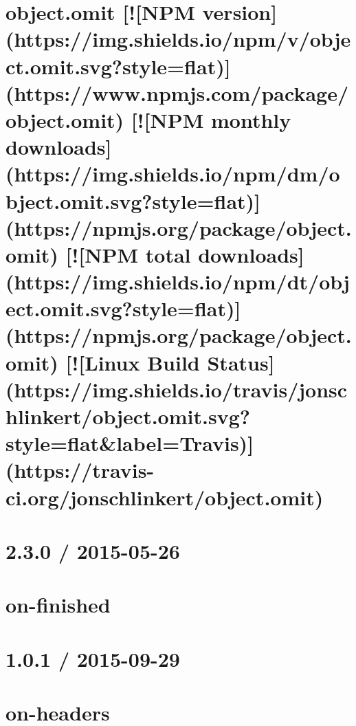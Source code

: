 \documentclass[twoside]{book}
\newcommand{\+}{\discretionary{\mbox{\scriptsize$\hookleftarrow$}}{}{}}
\begin{document}
\chapter{object.\+omit \mbox{[}!\mbox{[}N\+PM version\mbox{]}(https\+://img.shields.\+io/npm/v/object.omit.\+svg?style=flat)\mbox{]}(https\+://www.npmjs.\+com/package/object.omit) \mbox{[}!\mbox{[}N\+PM monthly downloads\mbox{]}(https\+://img.shields.\+io/npm/dm/object.omit.\+svg?style=flat)\mbox{]}(https\+://npmjs.org/package/object.omit) \mbox{[}!\mbox{[}N\+PM total downloads\mbox{]}(https\+://img.shields.\+io/npm/dt/object.omit.\+svg?style=flat)\mbox{]}(https\+://npmjs.org/package/object.omit) \mbox{[}!\mbox{[}Linux Build Status\mbox{]}(https\+://img.shields.\+io/travis/jonschlinkert/object.omit.\+svg?style=flat\&label=Travis)\mbox{]}(https\+://travis-\/ci.org/jonschlinkert/object.omit)}
\label{md__c_1_workspace_demo_src_main_script_node_modules_object_8omit__r_e_a_d_m_e}

\chapter{2.3.0 / 2015-\/05-\/26}
\label{md__c_1_workspace_demo_src_main_script_node_modules_on-finished__h_i_s_t_o_r_y}

\chapter{on-\/finished}
\label{md__c_1_workspace_demo_src_main_script_node_modules_on-finished__r_e_a_d_m_e}

\chapter{1.0.1 / 2015-\/09-\/29}
\label{md__c_1_workspace_demo_src_main_script_node_modules_on-headers__h_i_s_t_o_r_y}

\chapter{on-\/headers}
\label{md__c_1_workspace_demo_src_main_script_node_modules_on-headers__r_e_a_d_m_e}

\end{document}
